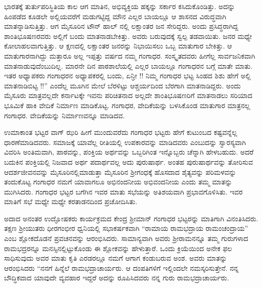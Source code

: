 {ಭಾರತಕ್ಕೆ ತುರ್ತುಪರಿಸ್ಥಿತಿಯ ಕಾಲ \enginline{-} ಆಗ ಮಾತಿನ, ಅಭಿವ್ಯಕ್ತಿಯ ಹಕ್ಕನ್ನು ಸರ್ಕಾರ ಕಸಿದುಕೊಂಡಿತ್ತು.  ಅದನ್ನು ಹಿಂಪಡೆದ ಕೂಡಲೇ ಅಲ್ಲಿಯವರೆಗೆ ಮಡುಗಟ್ಟಿದ್ದ ಮೌನ ಎಲ್ಲರ ಬಾಯಲ್ಲೂ ಆ ಶಾಸನದ ವಿರುದ್ಧವಾಗಿ ಮಾತನ್ನಾಡಿಸುತ್ತಿತ್ತು. ಆಗ ಮೈಸೂರಿನ ಟೌನ್ ಹಾಲ್ ನಲ್ಲಿ ಲಕ್ಷಾಂತರ ಜನ ಸೇರಿದ್ದರು. ಅಂದು ಪ್ರಸಿದ್ಧರಾಗಿದ್ದ ಶಾಂತಿ\break ಭೂಷಣರವರು ಅಲ್ಲಿಗೆ ಬಂದು ಮಾತನಾಡಬೇಕಿತ್ತು. ಅವರು ಬರುವುದಕ್ಕೆ ಸ್ವಲ್ಪ ತಡವಾಯಿತು. ಜನರ ಮಧ್ಯೇ ಕೋಲಾಹಲವಾಗುತ್ತಿತ್ತು. ಆ ಕ್ಷಣದಲ್ಲಿ ಲಕ್ಷಾಂತರ ಜನರನ್ನು ನಿಭಾಯಿಸಲು ಒಬ್ಬ ಮಾತುಗಾರ ಬೇಕಿತ್ತು. ಆ ಮಾತುಗಾರನಾಗಿದ್ದು ಮತ್ತಾರೂ ಅಲ್ಲ ಇಪ್ಪತ್ತು ವರ್ಷದ ನಮ್ಮ ಗಂಗಾಧರ. ಸಂಸ್ಕೃತದವರು ಹೀಗೆಲ್ಲ ಸಾರ್ವಜನಿಕ\-ವಾಗಿ ಮಾತನಾಡುವು\-ದೆಂಬುದಿಲ್ಲ. ಮಾರನೇ ದಿನ ಪಾಠಶಾಲೆಯಲ್ಲಿ ಎಲ್ಲರ ಬಾಯಲ್ಲೂ ಗಂಗಾಧರನ ಬಗ್ಗೆ ಮಾತೇ ಮಾತು. ಇತರ ಅಧ್ಯಾಪಕರು ಗಂಗಾಧರನ ಅಧ್ಯಾಪಕರಲ್ಲಿ ಬಂದು, ಏನ್ರೀ !! ನಿಮ್ಮ ಗಂಗಾಧರ ಭಟ್ಟ \enginline{-} ಸಿಂಹದ ಶಿಶು \enginline{-} ಹೇಗೆ ಅಲ್ಲಿ ಮಾತನಾಡಿ\-ಬಿಟ್ಟ !!” ಎಂದೆಲ್ಲ ಮೂಗಿನ ಮೇಲೆ ಬೆರಳಿಟ್ಟು ಆಶ್ಚರ್ಯದಿಂದ ಬೆರಗಾಗಿ ಮಾತನಾಡಿದ್ದರು. ಅಂದು ಮೈಸೂರು ಮಾತ್ರವಲ್ಲದೇ ಕರ್ನಾಟಕ್ಕೇ ಇವನು ಪರಿಚಿತನಾದ ಅಲ್ಲದೇ ಶಾಂತಿಭೂಷಣರಿಗೆ  ಮಾತನಾಡಲು ಸರಿಯಾದ ಭೂಮಿಕೆ ಹಾಕಿ ವೇದಿಕೆ ನಿರ್ಮಾಣ ಮಾಡಿಕೊಟ್ಟ. ಗಂಗಾಧರ, ವೇದಿಕೆಯನ್ನು ಬಳಸಿಕೊಂಡ ಮಾತುಗಾರ ಮಾತ್ರನಲ್ಲ ಗಂಗಾಧರ. ವೇದಿಕೆಯನ್ನು ನಿರ್ಮಾಣವನ್ನೂ ಮಾಡಿದವ. 

ಉಮಾಕಾಂತ ಭಟ್ಟರ ವಾಗ್ ಝರಿ  ಹೀಗೆ ಮುಂದುವರೆದು ಗಂಗಾಧರ ಭಟ್ಟರು ಹೇಗೆ ಕುಟುಂಬದ ಕಷ್ಟವನ್ನೆಲ್ಲ ಧಾರಣೆಮಾಡಿದವರು. ಸಮಾಜಕ್ಕೆ ಯಾವೆಲ್ಲ ರೀತಿಯಲ್ಲಿ ಉಪಕಾರವನ್ನು ಮಾಡಿದವರು ಎಂಬುದನ್ನು ಸ್ವಾರಸ್ಯವಾಗಿ ವಿವರಿಸಿ ಅಂತಿಮವಾಗಿ, \enginline{-} ಪಾಠವನ್ನು, ಪಂಕ್ತಿಯ ಅರ್ಥವನ್ನು ಒಬ್ಬರಿಗಿಂತ ಇನ್ನೊಬ್ಬರು  ಚೆನ್ನಾಗಿ ಹೇಳಬಹುದು. ಅದರೆ ಬದುಕಿನ ಪಂಕ್ತಿಯಲ್ಲಿ ನಿಜವಾದ ಅರ್ಥ ಪದಾರ್ಥವಲ್ಲ ಅದು ಪುರುಷಾರ್ಥ. ಅಂತಹ ಪುರುಷಾರ್ಥವನ್ನು ತೋರಿಸುವ ಆದರ್ಶಜೀವನವನ್ನು ಮೈಸೂರಿನಲ್ಲಿ\break ಮಾಡುತ್ತಾ ಮೈಸೂರಿನ ಶ್ರೀಗಂಧಕ್ಕೆ ಹೊಸದಾದ ಶೈತ್ಯವನ್ನು ಪರಿಮಳವನ್ನು ತಂದು\-ಕೊಟ್ಟ ಗಂಗಾಧರ ನಮಗೆ ಯಾವಾಗಲೂ ಅಭಿನಂದನೀಯ ಅಭಿವಂದನೀಯ ಎಂದು ತಮ್ಮ ಮಾತನ್ನು ಮುಗಿಸಿದರು. ಗಂಗಾಧರ ಭಟ್ಟರ ಬಗೆಗಿನ ಇವರ ಮಾತು ಸಭೆಯನ್ನು ಅತಿಶಯವಾಗಿ ಪ್ರಭಾವಗೊಳಿಸಿತು. ಇವರ ಮಾತಿಗೆ ಸಭೆ ಮಧ್ಯೇ ಮಧ್ಯೇ ಕರತಾಡನದಿಂದ ಪ್ರಚೋದಿಸಿತು.

ಅದಾದ ಅನಂತರ ಉದ್ಘೋಷಕರು ಕಾರ್ಯಕ್ರಮದ ಕೇಂದ್ರ ಶ್ರೀಮಾನ್ ಗಂಗಾಧರ ಭಟ್ಟರನ್ನು ಮಾತಿಗಾಗಿ ವಿನಂತಿಸಿದರು. ತಕ್ಷಣ ಶ್ರೀಯುತರು ಧೀರ\enginline{-}ಗಂಭೀರ ಧ್ವನಿಯಲ್ಲಿ ಸಭಾಕರ್ಷಕವಾಗಿ “ರಾಮಾಯ ರಾಮಭದ್ರಾಯ ರಾಮಂಚಂದ್ರಾಯ” ಎಂಬ ಶ್ಲೋಕದೊಡನೆ ಪ್ರವಚನವನ್ನು ಆರಂಭಿಸಿದರು. ಸಾಮಾನ್ಯವಾಗಿ ಅವರು ಶ್ರೀರಾಮ\-ನನ್ನೂ ತಮ್ಮ ಗುರುಗಳಾದ ರಾಮಭದ್ರರನ್ನೂ ಮನಸ್ಸಿನಲ್ಲಿಟ್ಟುಕೊಂಡು ಈ ಶ್ಲೋಕವನ್ನು ಹೇಳುತ್ತಾರೆ. ಒಂದು ಕ್ರಿಯೆಯಿಂದ ಅನೇಕ ಫಲ ಸಾಧಿಸುವುದು ಅವರ ಮಾತು ಕೃತಿ ಎರಡರಲ್ಲೂ ನಮಗೆ ಆಗಾಗ ಕಂಡುಬರುವ ಅಂಶ. ಅವರು ಮಾತನ್ನು ಆರಂಭಿಸಿದರು \enginline{-} “ನನಗೆ ಹಿನ್ನೆಲೆ ರಾಮಭದ್ರಾಚಾರ್ಯರು. ಆ ದಂಪತಿಗಳಿಗೆ ಇಲ್ಲಿಂದಲೇ ನಮಸ್ಕರಿಸುತ್ತೇನೆ. ನನ್ನ ಬೌದ್ಧಿಕವಾದ ಯಾವುದೇ ವ್ಯವಹಾರ ಇದ್ದರೆ ಅದನ್ನು ರೂಪಿಸಿದವರು ನನ್ನ ಗುರು ರಾಮಭದ್ರಾಚಾರ್ಯರು. 

}
